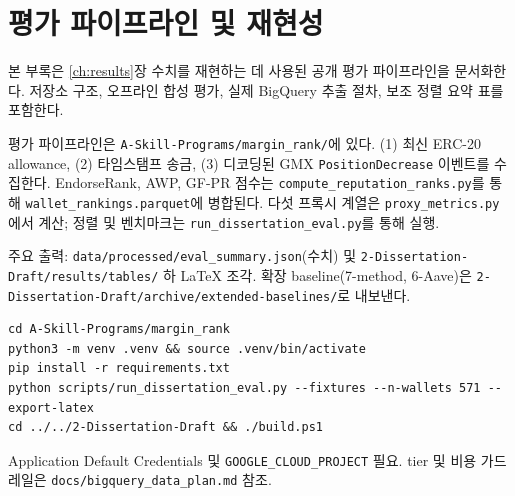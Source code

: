 \clearpage
\appendix
\chapter{평가 파이프라인 및 재현성}
\label{ch:appendix-eval}

본 부록은 \ref{ch:results}장 수치를 재현하는 데 사용된 공개 평가 파이프라인을 문서화한다. 저장소 구조, 오프라인 합성 평가, 실제 BigQuery 추출 절차, 보조 정렬 요약 표를 포함한다.


평가 파이프라인은 \texttt{A-Skill-Programs/margin\_rank/}에 있다. (1) 최신 ERC-20 allowance, (2) 타임스탬프 송금, (3) 디코딩된 GMX \texttt{PositionDecrease} 이벤트를 수집한다. EndorseRank, AWP, GF-PR 점수는 \texttt{compute\_reputation\_ranks.py}를 통해 \texttt{wallet\_rankings.parquet}에 병합된다. 다섯 프록시 계열은 \texttt{proxy\_metrics.py}에서 계산; 정렬 및 벤치마크는 \texttt{run\_dissertation\_eval.py}를 통해 실행.

주요 출력: \texttt{data/processed/eval\_summary.json}(수치) 및 \texttt{2-Dissertation-Draft/results/tables/} 하 LaTeX 조각. 확장 baseline(7-method, 6-Aave)은 \texttt{2-Dissertation-Draft/archive/extended-baselines/}로 내보낸다.


\begin{verbatim}
cd A-Skill-Programs/margin_rank
python3 -m venv .venv && source .venv/bin/activate
pip install -r requirements.txt
python scripts/run_dissertation_eval.py --fixtures --n-wallets 571 --export-latex
cd ../../2-Dissertation-Draft && ./build.ps1
\end{verbatim}


Application Default Credentials 및 \texttt{GOOGLE\_CLOUD\_PROJECT} 필요. tier 및 비용 가드레일은 \texttt{docs/bigquery\_data\_plan.md} 참조.

